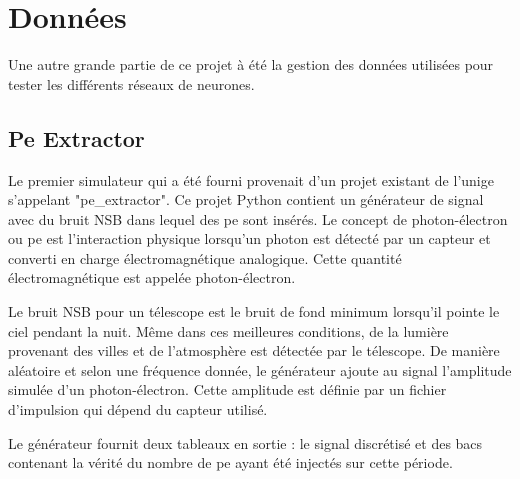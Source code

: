 \section{Données}

Une autre grande partie de ce projet à été la gestion des données utilisées pour tester les différents réseaux de neurones.

\subsection{Pe Extractor}

Le premier simulateur qui a été fourni provenait d'un projet existant de l'\gls{unige} s'appelant "pe\_extractor".
Ce projet Python contient un générateur de signal avec du bruit NSB dans lequel des \gls{pe} sont insérés.
Le concept de photon-électron ou \gls{pe} est l'interaction physique lorsqu'un photon est détecté par un capteur et converti en charge électromagnétique analogique.
Cette quantité électromagnétique est appelée photon-électron.

Le bruit NSB pour un télescope est le bruit de fond minimum lorsqu'il pointe le ciel pendant la nuit. Même dans ces meilleures conditions,
de la lumière provenant des villes et de l'atmosphère est détectée par le télescope. 
De manière aléatoire et selon une fréquence donnée, le générateur ajoute au signal l'amplitude simulée d'un photon-électron.
Cette amplitude est définie par un fichier d'impulsion qui dépend du capteur utilisé.

Le générateur fournit deux tableaux en sortie : le signal discrétisé et des bacs contenant la vérité du nombre de \gls{pe} ayant été injectés sur cette période.


